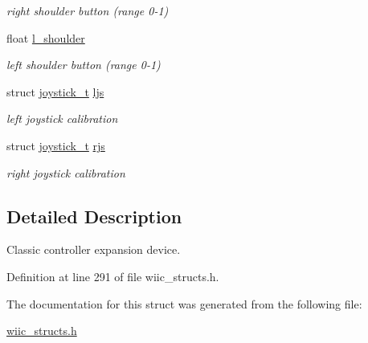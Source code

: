 \begin{DoxyCompactItemize}
\begin{DoxyCompactList}\small\item\em right shoulder button (range 0-\/1) \end{DoxyCompactList}\item 
\hypertarget{structclassic__ctrl__t_a81ab6316018923d2cc7ae436be5a46f1}{float \hyperlink{structclassic__ctrl__t_a81ab6316018923d2cc7ae436be5a46f1}{l\-\_\-shoulder}}\label{structclassic__ctrl__t_a81ab6316018923d2cc7ae436be5a46f1}

\begin{DoxyCompactList}\small\item\em left shoulder button (range 0-\/1) \end{DoxyCompactList}\item 
\hypertarget{structclassic__ctrl__t_a0fb0ee68b85831de93dffc5238bb87e0}{struct \hyperlink{structjoystick__t}{joystick\-\_\-t} \hyperlink{structclassic__ctrl__t_a0fb0ee68b85831de93dffc5238bb87e0}{ljs}}\label{structclassic__ctrl__t_a0fb0ee68b85831de93dffc5238bb87e0}

\begin{DoxyCompactList}\small\item\em left joystick calibration \end{DoxyCompactList}\item 
\hypertarget{structclassic__ctrl__t_aa27c616f6e84b2ca93e2a42bb7744fc8}{struct \hyperlink{structjoystick__t}{joystick\-\_\-t} \hyperlink{structclassic__ctrl__t_aa27c616f6e84b2ca93e2a42bb7744fc8}{rjs}}\label{structclassic__ctrl__t_aa27c616f6e84b2ca93e2a42bb7744fc8}

\begin{DoxyCompactList}\small\item\em right joystick calibration \end{DoxyCompactList}\end{DoxyCompactItemize}


\subsection{\-Detailed \-Description}
\-Classic controller expansion device. 

\-Definition at line 291 of file wiic\-\_\-structs.\-h.



\-The documentation for this struct was generated from the following file\-:\begin{DoxyCompactItemize}
\item 
\hyperlink{wiic__structs_8h}{wiic\-\_\-structs.\-h}\end{DoxyCompactItemize}
